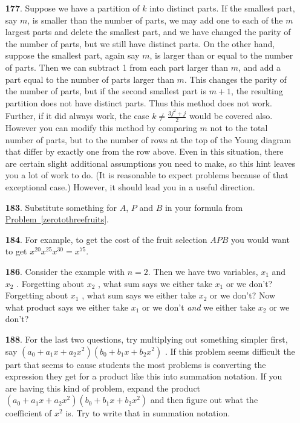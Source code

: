 \documentclass[10pt,]{book}
\theoremstyle{plain}
\theoremstyle{definition}
\theoremstyle{definition}
\numberwithin{equation}{chapter}
\begin{document}
\begin{itemize}[itemsep=1em]
\item[\textbf{177}.]Suppose we have a partition of \(k\) into distinct parts. If the smallest part, say \(m\), is smaller than the number of parts, we may add one to each of the \(m\) largest parts and delete the smallest part, and we have changed the parity of the number of parts, but we still have distinct parts. On the other hand, suppose the smallest part, again say \(m\), is larger than or equal to the number of parts. Then we can subtract 1 from each part larger than \(m\), and add a part equal to the number of parts larger than \(m\). This changes the parity of the number of parts, but if the second smallest part is \(m+1\), the resulting partition does not have distinct parts. Thus this method does not work. Further, if it did always work, the case \(k \ne \frac{3j^2+j}{2}\) would be covered also. However you can modify this method by comparing \(m\) not to the total number of parts, but to the number of rows at the top of the Young diagram that differ by exactly one from the row above. Even in this situation, there are certain slight additional assumptions you need to make, so this hint leaves you a lot of work to do. (It is reasonable to expect problems because of that exceptional case.) However, it should lead you in a useful direction.%

\item[\textbf{183}.]Substitute something for \(A\), \(P\) and \(B\) in your formula from \hyperref[zerotothreefruits]{Problem~\ref{zerotothreefruits}}.%

\item[\textbf{184}.]For example, to get the cost of the fruit selection \(AP B\) you would want to get \(x^{20} x^{25} x^{30} = x^{75}\).%

\item[\textbf{186}.]Consider the example with \(n = 2\). Then we have two variables, \(x_1\) and \(x_2\) .  Forgetting about \(x_2\) , what sum says we either take \(x_1\) or we don't? Forgetting about \(x_1\) , what sum says we either take \(x_2\) or we don't? Now what product says we either take \(x_1\) or we don't \emph{and} we either take \(x_2\) or we don't?%

\item[\textbf{188}.]For the last two questions, try multiplying out something simpler first, say \((a_0 + a_1 x + a_2 x^2 )(b_0 + b_1 x + b_2 x^2 )\) . If this problem seems difficult the part that seems to cause students the most problems is converting the expression they get for a product like this into summation notation. If you are having this kind of problem, expand the product \((a_0 + a_1 x + a_2 x^2 )(b_0 + b_1 x + b_2 x^2 )\) and then figure out what the coefficient of \(x^2\) is. Try to write that in summation notation.%


\end{itemize}
\end{document}

